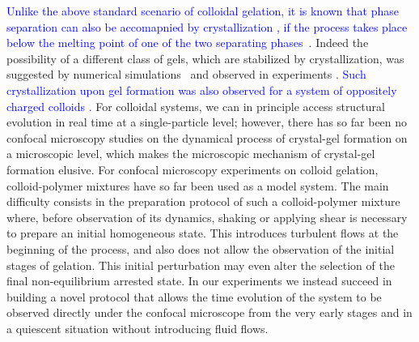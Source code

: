 \documentclass[preprint,amsmath,amssymb,superscriptaddress]{revtex4-1}
\begin{document}
\textcolor{blue}{Unlike the above standard scenario of colloidal gelation, it is known that phase separation can also be accomapnied by crystallization \cite{poon1999cpm,renth2001phase}, if the process takes place below the melting point of one of the two separating phases}~\cite{tanaka1985new}. Indeed the possibility of a different class of gels, which are stabilized by crystallization, 
was suggested by numerical simulations~\cite{soga1999metastable,fortini2008crystallization,perez2011pathways} and observed in experiments \cite{sabin2012,zhang2012non}. \textcolor{blue}{Such crystallization upon gel formation was also observed 
for a system of oppositely charged colloids \cite{sanz2008gel,sanz2008out}.}  
For colloidal systems, we can in principle access structural evolution in real time at a single-particle level; however, there has so far been no confocal microscopy  
studies on the dynamical process of crystal-gel formation on a microscopic level, which makes the microscopic mechanism of crystal-gel formation elusive. 
For confocal microscopy experiments on colloid gelation, colloid-polymer mixtures have so far been used as a model system. 
The main difficulty consists in the preparation protocol of such a colloid-polymer mixture where, before observation of its dynamics, shaking or applying shear is necessary to prepare an initial homogeneous state. This introduces turbulent flows at the beginning of the process, and also does not allow the
observation of the initial stages of gelation. This initial perturbation may even alter the selection of the final non-equilibrium arrested state.  
In our experiments we instead succeed in building a novel protocol that allows the time evolution of the system to be observed directly
under the confocal microscope from the very early stages and in a quiescent situation without introducing fluid flows. 
\end{document}
